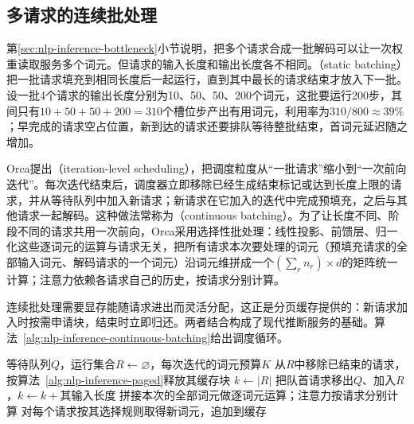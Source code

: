 \subsection{多请求的连续批处理}
\label{sec:nlp-inference-batching}

第\ref{sec:nlp-inference-bottleneck}小节说明，把多个请求合成一批解码可以让一次权重读取服务多个词元。但请求的输入长度和输出长度各不相同。（static batching）把一批请求填充到相同长度后一起运行，直到其中最长的请求结束才放入下一批。设一批4个请求的输出长度分别为10、50、50、200个词元，这批要运行200步，其间只有$10+50+50+200=310$个槽位步产出有用词元，利用率为$310/800\approx39\%$；早完成的请求空占位置，新到达的请求还要排队等待整批结束，首词元延迟随之增加。

Orca提出（iteration-level scheduling），把调度粒度从“一批请求”缩小到“一次前向迭代”。每次迭代结束后，调度器立即移除已经生成结束标记或达到长度上限的请求，并从等待队列中加入新请求；新请求在它加入的迭代中完成预填充，之后与其他请求一起解码。这种做法常称为（continuous batching）。为了让长度不同、阶段不同的请求共用一次前向，Orca采用选择性批处理：线性投影、前馈层、归一化这些逐词元的运算与请求无关，把所有请求本次要处理的词元（预填充请求的全部输入词元、解码请求的一个词元）沿词元维拼成一个$(\sum_r n_r)\times d$的矩阵统一计算；注意力依赖各请求自己的历史，按请求分别计算。

连续批处理需要显存能随请求进出而灵活分配，这正是分页缓存提供的：新请求加入时按需申请块，结束时立即归还。两者结合构成了现代推断服务的基础。算法~\ref{alg:nlp-inference-continuous-batching}给出调度循环。

\begin{algorithm}[连续批处理的调度循环]
  \label{alg:nlp-inference-continuous-batching}
  \begin{algorithmic}[1]
    \Require 等待队列$Q$，运行集合$R\gets\varnothing$，每次迭代的词元预算$K$
      \State 从$R$中移除已结束的请求，按算法~\ref{alg:nlp-inference-paged}释放其缓存块
      \State $k\gets|R|$
        \State 把队首请求移出$Q$、加入$R$，$k\gets k+$其输入长度
      \EndWhile
      \State 拼接本次的全部词元做逐词元运算；注意力按请求分别计算
      \State 对每个请求按其选择规则取得新词元，追加到缓存
    \EndWhile
  \end{algorithmic}
\end{algorithm}

